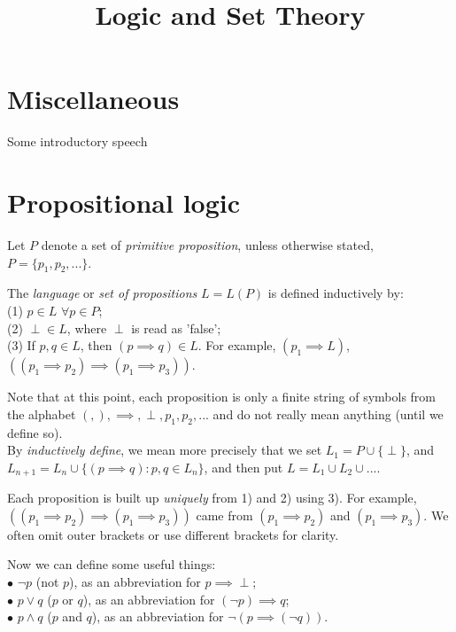 \documentclass[a4paper]{article}
\begin{document}
\title{Logic and Set Theory}

\maketitle

\newpage

\tableofcontents

\newpage

\section{Miscellaneous}

Some introductory speech

\newpage

\section{Propositional logic}
Let $P$ denote a set of \emph{primitive proposition}, unless otherwise stated, $P=\{p_1,p_2,...\}$.

\begin{defi}
The \emph{language} or \emph{set of propositions} $L=L(P)$ is defined inductively by:\\
(1) $p \in L$ $\forall p \in P$;\\
(2) $\perp \in L$, where $\perp$ is read as 'false';\\
(3) If $p,q \in L$, then $(p \implies q) \in L$. For example, $(p_1 \implies L)$, $((p_1 \implies p_2) \implies (p_1 \implies p_3))$.
\end{defi}

Note that at this point, each proposition is only a finite string of symbols from the alphabet $(,),\implies,\perp,p_1,p_2,...$ and do not really mean anything (until we define so).\\
By \emph{inductively define}, we mean more precisely that we set $L_1 = P \cup \{\perp\}$, and $L_{n+1} = L_n \cup \{(p \implies q):p,q \in L_n\}$, and then put $L = L_1 \cup L_2 \cup ...$.

Each proposition is built up \emph{uniquely} from 1) and 2) using 3). For example, $((p_1 \implies p_2) \implies (p_1 \implies p_3))$ came from $(p_1 \implies p_2)$ and $(p_1 \implies p_3)$. We often omit outer brackets or use different brackets for clarity.

Now we can define some useful things:\\
$\bullet$ $\neg p$ (not $p$), as an abbreviation for $p \implies \perp$;\\
$\bullet$ $p \vee q$ ($p$ or $q$), as an abbreviation for $(\neg p) \implies q$;\\
$\bullet$ $p \wedge q$ ($p$ and $q$), as an abbreviation for $\neg (p \implies (\neg q))$.
\end{document}
